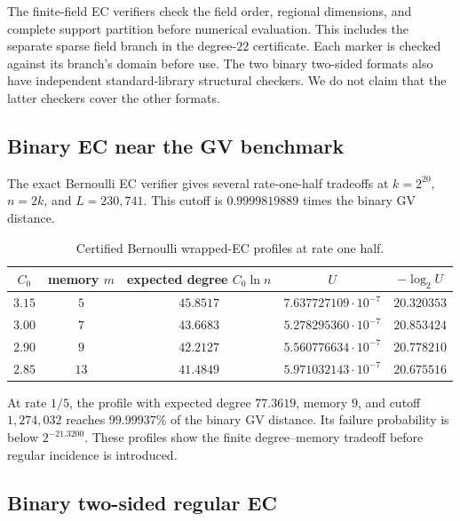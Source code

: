 The finite-field EC verifiers check the field order, regional dimensions,
and complete support partition before numerical evaluation.  This includes
the separate sparse field branch in the degree-$22$ certificate.  Each
marker is checked against its branch's domain before use.  The two
binary two-sided formats also have independent standard-library structural
checkers.  We do not claim that the latter checkers cover the other formats.

\subsection{Binary EC near the GV benchmark}

The exact Bernoulli EC verifier gives several rate-one-half tradeoffs at
$k=2^{20}$, $n=2k$, and $L=230{,}741$.  This cutoff is
$0.9999819889$ times the binary GV distance.

\begin{table}[t]
\centering
\caption{Certified Bernoulli wrapped-EC profiles at rate one half.}
\label{tab:binary-rate-half-frontier}
\begin{tabular}{@{}ccccc@{}}
\toprule
$C_0$ & memory $m$ & expected degree $C_0\ln n$ & $U$ & $-\log_2U$ \\
\midrule
$3.15$ & $5$  & $45.8517$ & $7.637727109\cdot10^{-7}$ & $20.320353$ \\
$3.00$ & $7$  & $43.6683$ & $5.278295360\cdot10^{-7}$ & $20.853424$ \\
$2.90$ & $9$  & $42.2127$ & $5.560776634\cdot10^{-7}$ & $20.778210$ \\
$2.85$ & $13$ & $41.4849$ & $5.971032143\cdot10^{-7}$ & $20.675516$ \\
\bottomrule
\end{tabular}
\end{table}

At rate $1/5$, the profile with expected degree $77.3619$, memory $9$, and
cutoff $1{,}274{,}032$ reaches $99.99937\%$ of the binary GV distance.  Its
failure probability is below $2^{-21.3200}$.  These profiles show the finite
degree--memory tradeoff before regular incidence is introduced.

\subsection{Binary two-sided regular EC}

